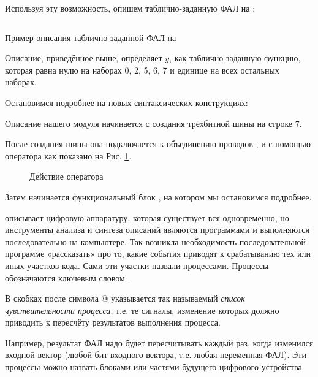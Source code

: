 \par{Используя эту возможность, опишем таблично-заданную ФАЛ на :}


\begin{listing}[H]
	\inputminted{SystemVerilog}{code_examples/lab_1/function_example.sv}
	\caption{Пример описания таблично-заданной ФАЛ на }
\end{listing}


\par{Описание, приведённое выше, определяет $y$, как таблично-заданную функцию, которая равна нулю на наборах 0, 2, 5, 6, 7 и единице на всех остальных наборах.}

\par{Остановимся подробнее на новых синтаксических конструкциях:}
\par{Описание нашего модуля начинается с создания трёхбитной шины  на строке 7.}
\par{После создания шины  она подключается к объединению проводов ,  и  с помощью оператора  как показано на Рис. \ref{fig:assign}.}

\begin{figure}[H]
  \centering
  \def\svgwidth{8cm}
  
  \caption{Действие оператора }
  \label{fig:assign}
\end{figure}

\par{Затем начинается функциональный блок , на котором мы остановимся подробнее.}
\par{ описывает цифровую аппаратуру, которая существует вся одновременно, но инструменты анализа и синтеза описаний являются программами и выполняются последовательно на компьютере. Так возникла необходимость последовательной программе «рассказать» про то, какие события приводят к срабатыванию тех или иных участков кода. Сами эти участки назвали процессами. Процессы обозначаются ключевым словом .}

\par{В скобках после символа @ указывается так называемый \emph{список чувствительности процесса}, т.е. те сигналы, изменение которых должно приводить к пересчёту результатов выполнения процесса.}


\par{Например, результат ФАЛ надо будет пересчитывать каждый раз, когда изменился входной вектор (любой бит входного вектора, т.е. любая переменная ФАЛ). Эти процессы можно назвать блоками или частями будущего цифрового устройства.}


